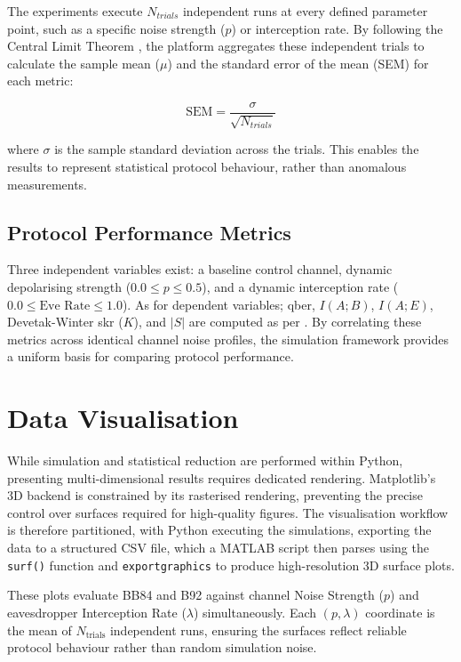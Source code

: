 \documentclass[11pt, a4paper]{report}
\begin{document}
The experiments execute $N_{trials}$ independent runs at every defined parameter point, such as a specific noise strength ($p$) or interception rate. By following the Central Limit Theorem \cite{montgomery2018}, the platform aggregates these independent trials to calculate the sample mean ($\mu$) and the standard error of the mean (SEM) for each metric:

\begin{equation}
\text{SEM} = \frac{\sigma}{\sqrt{N_{trials}}}
\label{eq:sem}
\end{equation}

where $\sigma$ is the sample standard deviation across the trials. This enables the results to represent statistical protocol behaviour, rather than anomalous measurements.

\subsection{Protocol Performance Metrics}
\label{subsec:performance_metrics}

Three independent variables exist: a baseline control channel, dynamic depolarising strength ($0.0 \leq p \leq 0.5$), and a dynamic interception rate ($0.0 \leq \text{Eve Rate} \leq 1.0$). As for dependent variables; \gls{qber}, $I(A;B)$, $I(A;E)$, Devetak-Winter \gls{skr} ($K$), and $|S|$ are computed as per . By correlating these metrics across identical channel noise profiles, the simulation framework provides a uniform basis for comparing protocol performance.


\section{Data Visualisation}
\label{sec:dataviz}

While simulation and statistical reduction are performed within Python, presenting multi-dimensional results requires dedicated rendering. Matplotlib's 3D backend is constrained by its rasterised rendering, preventing the precise control over surfaces required for high-quality figures. The visualisation workflow is therefore partitioned, with Python executing the simulations, exporting the data to a structured CSV file, which a MATLAB script then parses using the \texttt{surf()} function and \texttt{exportgraphics} to produce high-resolution 3D surface plots.

These plots evaluate BB84 and B92 against channel Noise Strength ($p$) and eavesdropper Interception Rate ($\lambda$) simultaneously. Each $(p, \lambda)$ coordinate is the mean of $N_{\text{trials}}$ independent runs, ensuring the surfaces reflect reliable protocol behaviour rather than random simulation noise.
\end{document}
